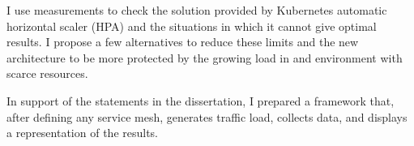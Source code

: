 I use measurements to check the solution provided by Kubernetes automatic horizontal scaler (HPA) and the situations in which it cannot give optimal results.
I propose a few alternatives to reduce these limits and the new architecture to be more protected by the growing load in and environment with scarce resources.

In support of the statements in the dissertation, I prepared a framework that, after defining any service mesh, generates traffic load, collects data, and displays a representation of the results.

\vfill
\selectthesislanguage

\setcounter{romanPage}{\value{page}}
